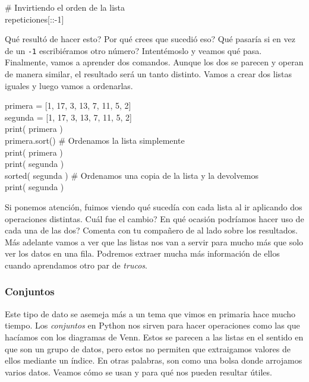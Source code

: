 \documentclass[10pt,letterpaper]{article}
\newcommand{\inlinecode}[1]{
\colorbox{light-gray}{\texttt{#1}}
}
\newenvironment{Code}
{
\begin{lrbox}{\selvestebox}%
\begin{minipage}{\dimexpr\columnwidth-2\fboxsep\relax}
\fontfamily{\ttdefault}\selectfont
}
{\end{minipage}\end{lrbox}%
\begin{center}
\colorbox{light-gray}{\usebox{\selvestebox}}
\end{center}
}
\begin{document}
\begin{Code}
\# Invirtiendo el orden de la lista\\
repeticiones[::-1]
\end{Code}

Qu\'e result\'o de hacer esto? Por qu\'e crees que sucedi\'o eso? Qu\'e pasar\'ia si en vez de un \inlinecode{-1} escribi\'eramos otro n\'umero? Intent\'emoslo y veamos qu\'e pasa.\\

Finalmente, vamos a aprender dos comandos. Aunque los dos se parecen y operan de manera similar, el resultado ser\'a un tanto distinto. Vamos a crear dos listas iguales y luego vamos a ordenarlas.

\begin{Code}
primera = [1, 17, 3, 13, 7, 11, 5, 2]\\
segunda = [1, 17, 3, 13, 7, 11, 5, 2]\\
print( primera )\\
primera.sort() \# Ordenamos la lista simplemente\\
print( primera )\\
print( segunda )\\
sorted( segunda ) \# Ordenamos una copia de la lista y la devolvemos\\
print( segunda )
\end{Code}

Si ponemos atenci\'on, fuimos viendo qu\'e suced\'ia con cada lista al ir aplicando dos operaciones distintas. Cu\'al fue el cambio? En qu\'e ocasi\'on podr\'iamos hacer uso de cada una de las dos? Comenta con tu compa\~nero de al lado sobre los resultados.\\

M\'as adelante vamos a ver que las listas nos van a servir para mucho m\'as que solo ver los datos en una fila. Podremos extraer mucha m\'as informaci\'on de ellos cuando aprendamos otro par de \emph{trucos}.

\subsubsection{Conjuntos}
Este tipo de dato se asemeja m\'as a un tema que vimos en primaria hace mucho tiempo. Los \emph{conjuntos} en Python nos sirven para hacer operaciones como las que hac\'iamos con los diagramas de Venn. Estos se parecen a las listas en el sentido en que son un grupo de datos, pero estos no permiten que extraigamos valores de ellos mediante un \'indice. En otras palabras, son como una bolsa donde arrojamos varios datos. Veamos c\'omo se usan y para qu\'e nos pueden resultar \'utiles.\\
\end{document}
